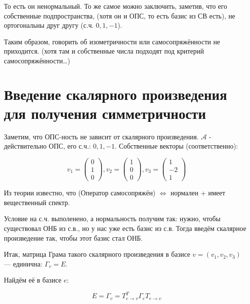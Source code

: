 \documentclass[12pt, a4paper]{article}
\begin{document}
    То есть он ненормальный. То же самое можно заключить, заметив, что его собственные подпространства, (хотя он и ОПС, то есть базис из СВ есть),
    не ортогональны друг другу (с.ч. $0, 1, -1$).

    Таким образом, говорить об изометричности или самосопряжённости не приходится.
    (хотя там и собственные числа подходят под критерий самосопряжённости…)


    \section{Введение скалярного произведения для получения симметричности}

    Заметим, что ОПС-ность не зависит от скалярного произведения.
    $\mathcal{A}$ - действительно ОПС, его с.ч.: $0, 1, -1$. Собственные векторы (соответственно):

    \begin{equation}
        v_1 = \begin{pmatrix}
            0 \\ 1 \\ 0
        \end{pmatrix}, v_2 = \begin{pmatrix}
            1 \\ 0 \\ 0
        \end{pmatrix}, v_3 = \begin{pmatrix}
            1 \\ -2 \\ 1
        \end{pmatrix}
    \end{equation}

    Из теории известно, что  (Оператор самосопряжён) $\Leftrightarrow$ нормален + имеет вещественный спектр.

    Условие на с.ч. выполенено, а нормальность получим так: нужно, чтобы существовал ОНБ из с.в., 
    но у нас уже есть базис из с.в. Тогда введём скалярное произведение так, чтобы этот базис стал ОНБ.

    Итак, матрица Грама такого скалярного произведения в базисе $v = (v_1, v_2, v_3)$ — единична: $\Gamma_v = E$.

    Найдём её в базисе $e$:

    \begin{equation}
        E = \Gamma_v = T_{e → v}^T \Gamma_e T_{e → v}
    \end{equation}
\end{document}
